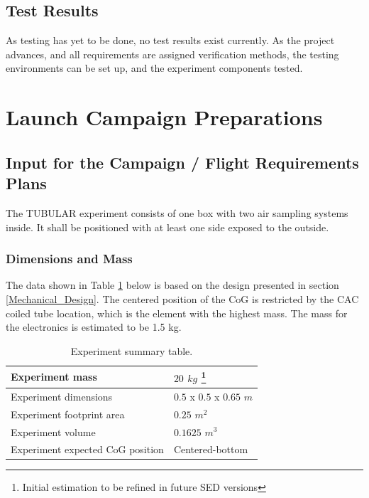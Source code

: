 \documentclass[a4paper,12pt,twoside]{article}
\begin{document}
\raggedbottom
\pagebreak

\subsection{Test Results}
As testing has yet to be done, no test results exist currently. As the project advances, and all requirements are assigned verification methods, the testing environments can be set up, and the experiment components tested.
\pagebreak
\section{Launch Campaign Preparations}
\subsection{Input for the Campaign / Flight Requirements Plans}

The TUBULAR experiment consists of one box with two air sampling systems inside. It shall be positioned with at least one side exposed to the outside.

\subsubsection{Dimensions and Mass}

The data shown in Table \ref{dimensions_mass} below is based on the design presented in section \ref{Mechanical_Design}. The centered position of the CoG is restricted by the CAC coiled tube location, which is the element with the highest mass. The mass for the electronics is estimated to be 1.5 kg.  

\begin{table}[!ht]
\centering
\begin{tabular}{|l|l|}
\hline
 Experiment mass  & $20$ $kg$ \footnote[13]{Initial estimation to be refined in future SED versions} \\ \hline
 Experiment dimensions & $0.5$ x $0.5$ x $0.65$ $m$ \\ \hline
 Experiment footprint area & $0.25$ $m^2$ \\ \hline
 Experiment volume  & $0.1625$ $m^3$ \\ \hline
 Experiment expected CoG position &  Centered-bottom \\ \hline
\end{tabular}
\caption{Experiment summary table.}
\label{dimensions_mass}
\end{table}
\raggedbottom
\end{document}
